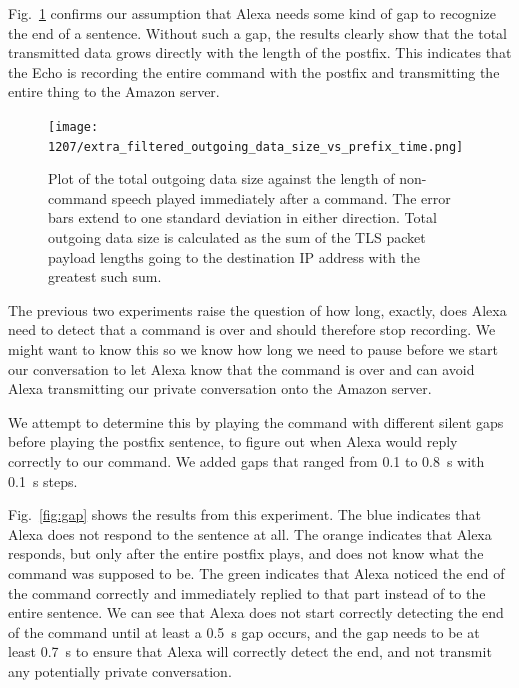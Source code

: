 Fig.~\ref{fig:postfix_nogap} confirms our assumption that Alexa needs some kind of gap to recognize the end of a sentence. Without such a gap, the results clearly show that the total transmitted data grows directly with the length of the postfix. This indicates that the Echo is recording the entire command with the postfix and transmitting the entire thing to the Amazon server.


\begin{figure}[!t]
    \centering
    \texttt{[image: 1207/extra\_filtered\_outgoing\_data\_size\_vs\_prefix\_time.png]}
    \caption{Plot of the total outgoing data size against the length of non-command speech played immediately after a command. The error bars extend to one standard deviation in either direction. Total outgoing data size is calculated as the sum of the TLS packet payload lengths going to the destination IP address with the greatest such sum.}
    \label{fig:postfix_nogap}
\end{figure}

The previous two experiments raise the question of how long, exactly, does Alexa need to detect that a command is over and should therefore stop recording. We might want to know this so we know how long we need to pause before we start our conversation to let Alexa know that the command is over and can avoid Alexa transmitting our private conversation onto the Amazon server. 

We attempt to determine this by playing the command with different silent gaps before playing the postfix sentence, to figure out when Alexa would reply correctly to our command. We added gaps that ranged from 0.1 to 0.8~s with 0.1~s steps.

Fig.~\ref{fig:gap} shows the results from this experiment. The blue indicates that Alexa does not respond to the sentence at all. The orange indicates that Alexa responds, but only after the entire postfix plays, and does not know what the command was supposed to be. The green indicates that Alexa noticed the end of the command correctly and immediately replied to that part instead of to the entire sentence. We can see that Alexa does not start correctly detecting the end of the command until at least a 0.5~s gap occurs, and the gap needs to be at least 0.7~s to ensure that Alexa will correctly detect the end, and not transmit any potentially private conversation.


